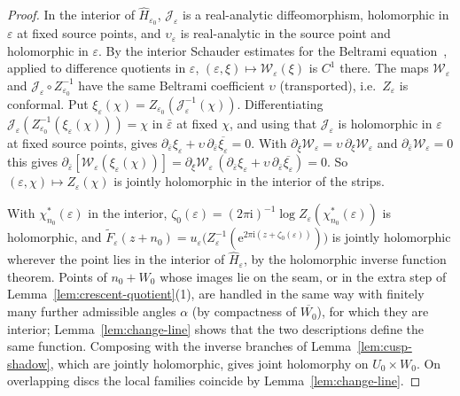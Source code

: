 \documentclass[11pt]{amsart}
\theoremstyle{definition}
\newcommand{\eee}{\mathrm{e}}
\newcommand{\ii}{\mathrm{i}}
\begin{document}
\begin{proof}
In the interior of $\hat H_{\varepsilon_0}$, $\mathcal J_\varepsilon$ is a real-analytic diffeomorphism,
holomorphic in $\varepsilon$ at fixed source points, and $\upsilon_\varepsilon$ is real-analytic in the
source point and holomorphic in $\varepsilon$.  By the interior Schauder estimates for
the Beltrami equation~\cite[Ch.~V]{AhlforsLectures}, applied to difference
quotients in $\varepsilon$, $(\varepsilon,\xi)\mapsto\mathcal W_\varepsilon(\xi)$ is $C^1$ there.  The maps $\mathcal W_\varepsilon$ and
$\mathcal J_\varepsilon\circ Z_{\varepsilon_0}^{-1}$ have the same Beltrami coefficient $\upsilon$ (transported),
i.e.\ $Z_\varepsilon$ is conformal.  Put $\xi_\varepsilon(\chi)=Z_{\varepsilon_0}(\mathcal J_\varepsilon^{-1}(\chi))$.  Differentiating
$\mathcal J_\varepsilon(Z_{\varepsilon_0}^{-1}(\xi_\varepsilon(\chi)))=\chi$ in $\bar\varepsilon$ at fixed $\chi$, and using that
$\mathcal J_\varepsilon$ is holomorphic in $\varepsilon$ at fixed source points, gives
$\partial_{\bar\varepsilon}\xi_\varepsilon+\upsilon\,\partial_{\bar\varepsilon}\overline{\xi_\varepsilon}=0$.  With
$\partial_{\bar\xi}\mathcal W_\varepsilon=\upsilon\,\partial_\xi\mathcal W_\varepsilon$ and $\partial_{\bar\varepsilon}\mathcal W_\varepsilon=0$ this gives
$\partial_{\bar\varepsilon}[\mathcal W_\varepsilon(\xi_\varepsilon(\chi))]=\partial_\xi\mathcal W_\varepsilon\,(\partial_{\bar\varepsilon}\xi_\varepsilon+\upsilon\,\partial_{\bar\varepsilon}\overline{\xi_\varepsilon})=0$.
So $(\varepsilon,\chi)\mapsto Z_\varepsilon(\chi)$ is jointly holomorphic in the interior of the strips.

With $\chi^*_{n_0}(\varepsilon)$ in the interior,
$\zeta_0(\varepsilon)=(2\pi\ii)^{-1}\log Z_\varepsilon(\chi^*_{n_0}(\varepsilon))$ is holomorphic, and
$\tilde F_\varepsilon(z+n_0)=u_\varepsilon\bigl(Z_\varepsilon^{-1}(\eee^{2\pi\ii(z+\zeta_0(\varepsilon))})\bigr)$ is jointly
holomorphic wherever the point lies in the interior of $\hat H_\varepsilon$, by the
holomorphic inverse function theorem.  Points of $n_0+W_0$ whose images lie
on the seam, or in the extra step of Lemma~\ref{lem:crescent-quotient}(1), are
handled in the same way with finitely many further admissible angles $\alpha$
(by compactness of $\overline{W_0}$), for which they are interior; Lemma~\ref{lem:change-line} shows that the two descriptions
define the same function.  Composing with the inverse branches of
Lemma~\ref{lem:cusp-shadow}, which are jointly holomorphic, gives joint
holomorphy on $U_0\times W_0$.  On overlapping discs the local families
coincide by Lemma~\ref{lem:change-line}.
\end{proof}
\end{document}
